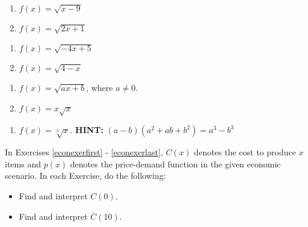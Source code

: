 \begin{multicols}{2}
\begin{enumerate}
\setcounter{enumi}{\value{HW}}

\item  $f(x) = \sqrt{x-9}$
\item  $f(x) = \sqrt{2x+1}$

\setcounter{HW}{\value{enumi}}
\end{enumerate}
\end{multicols}

\begin{multicols}{2}
\begin{enumerate}
\setcounter{enumi}{\value{HW}}

\item  $f(x) = \sqrt{-4x+5}$
\item  $f(x) = \sqrt{4-x}$

\setcounter{HW}{\value{enumi}}
\end{enumerate}
\end{multicols}

\begin{multicols}{2}
\begin{enumerate}
\setcounter{enumi}{\value{HW}}

\item  $f(x) = \sqrt{ax+b}$, where $a \neq 0$.
\item  $f(x) = x \sqrt{x}$ 

\setcounter{HW}{\value{enumi}}
\end{enumerate}
\end{multicols}

\begin{enumerate}
\setcounter{enumi}{\value{HW}}

\item  $f(x) = \sqrt[3]{x}$.  \textbf{HINT:}  $(a-b)\left(a^2+ab+b^2\right) = a^3 - b^3$  \label{diffquotexerlast}

\setcounter{HW}{\value{enumi}}
\end{enumerate}

In Exercises \ref{econexerfirst} - \ref{econexerlast}, $C(x)$ denotes the cost to produce $x$ items and $p(x)$ denotes the price-demand function in the given economic scenario.  In each Exercise, do the following:

\begin{multicols}{2}
\begin{itemize}

\item  Find and interpret $C(0)$.
\item  Find and interpret $\overline{C}(10)$.

\end{itemize}
\end{multicols}

